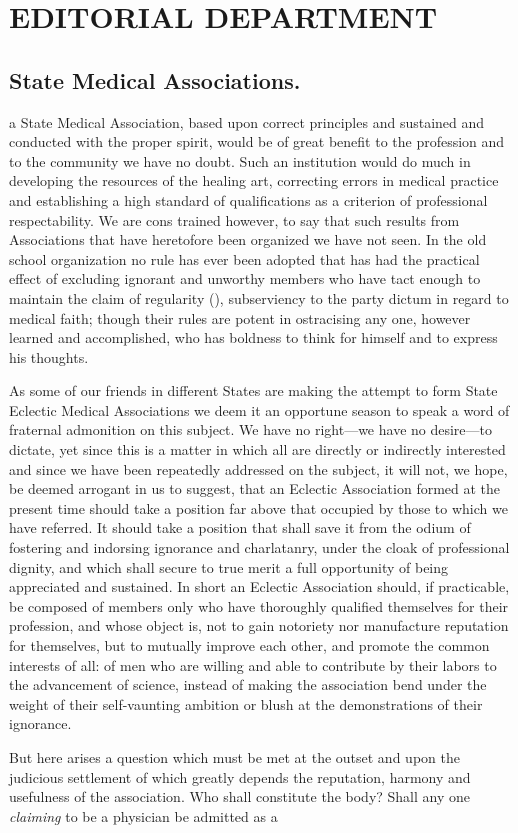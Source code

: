 
\chapter*[Editorial Department]{EDITORIAL DEPARTMENT}

\section*{State Medical Associations.}

 a State Medical Association, based upon correct principles and
sustained and conducted with the proper spirit, would be of great benefit
to the profession and to the community we have no doubt. Such an
institution would do much in developing the resources of the healing
art, correcting errors in medical practice and establishing a high standard
of qualifications as a criterion of professional respectability. We
are cons trained however, to say that such results from Associations that
have heretofore been organized we have not seen. In the old school
organization no rule has ever been adopted that has had the practical
effect of excluding ignorant and unworthy members who have tact
enough to maintain the claim of regularity (), subserviency to the
party dictum in regard to medical faith; though their rules are potent
in ostracising any one, however learned and accomplished, who has boldness
to think for himself and to express his thoughts.

As some of our friends in different States are making the attempt to
form State Eclectic Medical Associations we deem it an opportune
season to speak a word of fraternal admonition on this subject. We
have no right---we have no desire---to dictate, yet since this is a matter
in which all are directly or indirectly interested and since we have been
repeatedly addressed on the subject, it will not, we hope, be deemed
arrogant in us to suggest, that an Eclectic Association formed at the
present time should take a position far above that occupied by those
to which we have referred. It should take a position that shall save
it from the odium of fostering and indorsing ignorance and charlatanry,
under the cloak of professional dignity, and which shall secure to true
merit a full opportunity of being appreciated and sustained. In short
an Eclectic Association should, if practicable, be composed of members
only who have thoroughly qualified themselves for their profession, and
whose object is, not to gain notoriety nor manufacture reputation for
themselves, but to mutually improve each other, and promote the common
interests of all: of men who are willing and able to contribute by
their labors to the advancement of science, instead of making the
association bend under the weight of their self-vaunting ambition or
blush at the demonstrations of their ignorance.

But here arises a question which must be met at the outset and
upon the judicious settlement of which greatly depends the reputation,
harmony and usefulness of the association. Who shall constitute the
body?  Shall any one \emph{claiming} to be a physician be admitted as a\endinput
